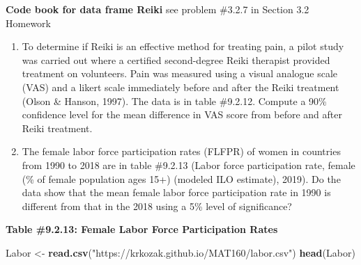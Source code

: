 \documentclass[]{book}
\newenvironment{Shaded}{\begin{snugshade}}{\end{snugshade}}
\newcommand{\KeywordTok}[1]{\textcolor[rgb]{0.13,0.29,0.53}{\textbf{#1}}}
\newcommand{\NormalTok}[1]{#1}
\newcommand{\StringTok}[1]{\textcolor[rgb]{0.31,0.60,0.02}{#1}}
\begin{document}
\textbf{Code book for data frame Reiki} see problem \#3.2.7 in Section 3.2 Homework

\begin{enumerate}
\def\labelenumi{\arabic{enumi}.}
\setcounter{enumi}{7}
\item
  To determine if Reiki is an effective method for treating pain, a pilot study was carried out where a certified second-degree Reiki therapist provided treatment on volunteers. Pain was measured using a visual analogue scale (VAS) and a likert scale immediately before and after the Reiki treatment (Olson \& Hanson, 1997). The data is in table \#9.2.12. Compute a 90\% confidence level for the mean difference in VAS score from before and after Reiki treatment.
\item
  The female labor force participation rates (FLFPR) of women in countries from 1990 to 2018 are in table \#9.2.13 (Labor force participation rate, female (\% of female population ages 15+) (modeled ILO estimate), 2019). Do the data show that the mean female labor force participation rate in 1990 is different from that in the 2018 using a 5\% level of significance?
\end{enumerate}

\textbf{Table \#9.2.13: Female Labor Force Participation Rates}

\begin{Shaded}
\begin{Highlighting}[]
\NormalTok{Labor <-}\StringTok{ }\KeywordTok{read.csv}\NormalTok{(}\StringTok{"https://krkozak.github.io/MAT160/labor.csv"}\NormalTok{)}
\KeywordTok{head}\NormalTok{(Labor)}
\end{Highlighting}
\end{Shaded}
\end{document}
